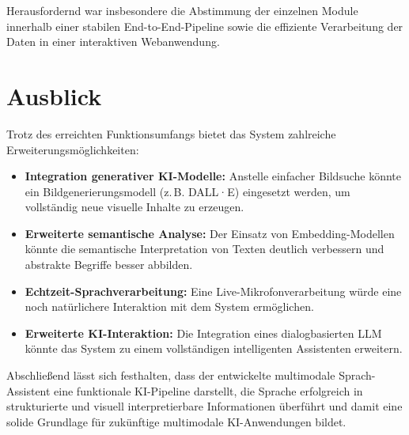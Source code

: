 Herausfordernd war insbesondere die Abstimmung der einzelnen Module innerhalb einer stabilen End-to-End-Pipeline sowie die effiziente Verarbeitung der Daten in einer interaktiven Webanwendung.

\section{Ausblick}
Trotz des erreichten Funktionsumfangs bietet das System zahlreiche Erweiterungsmöglichkeiten:

\begin{itemize}
    \item \textbf{Integration generativer KI-Modelle:} Anstelle einfacher Bildsuche könnte ein Bildgenerierungsmodell (z.\,B. DALL·E) eingesetzt werden, um vollständig neue visuelle Inhalte zu erzeugen.

    \item \textbf{Erweiterte semantische Analyse:} Der Einsatz von Embedding-Modellen könnte die semantische Interpretation von Texten deutlich verbessern und abstrakte Begriffe besser abbilden.

    \item \textbf{Echtzeit-Sprachverarbeitung:} Eine Live-Mikrofonverarbeitung würde eine noch natürlichere Interaktion mit dem System ermöglichen.

    \item \textbf{Erweiterte KI-Interaktion:} Die Integration eines dialogbasierten LLM könnte das System zu einem vollständigen intelligenten Assistenten erweitern.
\end{itemize}

Abschließend lässt sich festhalten, dass der entwickelte multimodale Sprach-Assistent eine funktionale KI-Pipeline darstellt, die Sprache erfolgreich in strukturierte und visuell interpretierbare Informationen überführt und damit eine solide Grundlage für zukünftige multimodale KI-Anwendungen bildet.
